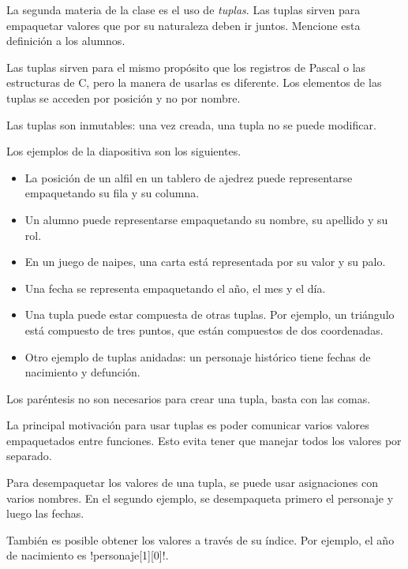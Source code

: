 \documentclass[10pt]{article}
\begin{document}

  La segunda materia de la clase es el uso de \emph{tuplas}.
  Las tuplas sirven para empaquetar valores
  que por su naturaleza deben ir juntos.
  Mencione esta definición a los alumnos.

  Las tuplas sirven para el mismo propósito
  que los registros de Pascal o las estructuras de C,
  pero la manera de usarlas es diferente.
  Los elementos de las tuplas se acceden por posición
  y no por nombre.

  Las tuplas son inmutables:
  una vez creada, una tupla no se puede modificar.

  Los ejemplos de la diapositiva son los siguientes.
  \begin{itemize}
    \item La posición de un alfil en un tablero de ajedrez
      puede representarse empaquetando su fila y su columna.
    \item Un alumno puede representarse
      empaquetando su nombre, su apellido y su rol.
    \item En un juego de naipes,
      una carta está representada por su valor y su palo.
    \item Una fecha se representa empaquetando
      el año, el mes y el día.
    \item Una tupla puede estar compuesta de otras tuplas.
      Por ejemplo, un triángulo está compuesto de tres puntos,
      que están compuestos de dos coordenadas.
    \item Otro ejemplo de tuplas anidadas:
      un personaje histórico tiene fechas de nacimiento y defunción.
  \end{itemize}

  Los paréntesis no son necesarios para crear una tupla,
  basta con las comas.

  La principal motivación para usar tuplas
  es poder comunicar varios valores empaquetados entre funciones.
  Esto evita tener que manejar todos los valores por separado.


  Para desempaquetar los valores de una tupla,
  se puede usar asignaciones con varios nombres.
  En el segundo ejemplo,
  se desempaqueta primero el personaje y luego las fechas.

  También es posible obtener los valores a través de su índice.
  Por ejemplo, el año de nacimiento es \li!personaje[1][0]!.

\end{document}
